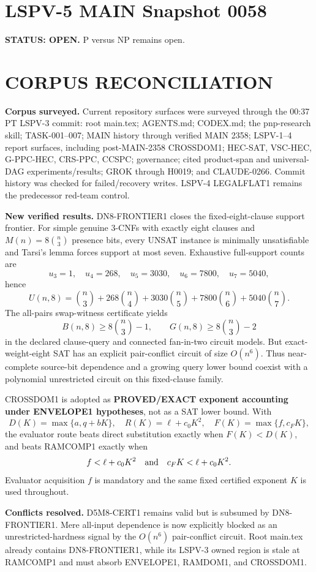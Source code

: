 \documentclass[11pt]{article}
\begin{document}
\section*{LSPV-5 MAIN Snapshot 0058}
\textbf{STATUS: OPEN.} P versus NP remains open.

\section*{CORPUS RECONCILIATION}
\textbf{Corpus surveyed.} Current repository surfaces were surveyed through the 00:37 PT LSPV-3 commit: root main.tex; AGENTS.md; CODEX.md; the pnp-research skill; TASK-001--007; MAIN history through verified MAIN 2358; LSPV-1--4 report surfaces, including post-MAIN-2358 CROSSDOM1; HEC-SAT, VSC-HEC, G-PPC-HEC, CRS-PPC, CCSPC; governance; cited product-span and universal-DAG experiments/results; GROK through H0019; and CLAUDE-0266. Commit history was checked for failed/recovery writes. LSPV-4 LEGALFLAT1 remains the predecessor red-team control.

\textbf{New verified results.} DN8-FRONTIER1 closes the fixed-eight-clause support frontier. For simple genuine 3-CNFs with exactly eight clauses and \(M(n)=8\binom n3\) presence bits, every UNSAT instance is minimally unsatisfiable and Tarsi's lemma forces support at most seven. Exhaustive full-support counts are
\[
u_3=1,\quad u_4=268,\quad u_5=3030,\quad u_6=7800,\quad u_7=5040,
\]
hence
\[
U(n,8)=\binom n3+268\binom n4+3030\binom n5+7800\binom n6+5040\binom n7.
\]
The all-pairs swap-witness certificate yields
\[
B(n,8)\ge8\binom n3-1,\qquad G(n,8)\ge8\binom n3-2
\]
in the declared clause-query and connected fan-in-two circuit models. But exact-weight-eight SAT has an explicit pair-conflict circuit of size \(O(n^6)\). Thus near-complete source-bit dependence and a growing query lower bound coexist with a polynomial unrestricted circuit on this fixed-clause family.

CROSSDOM1 is adopted as \textbf{PROVED/EXACT exponent accounting under ENVELOPE1 hypotheses}, not as a SAT lower bound. With
\[
D(K)=\max\{a,q+bK\},\quad R(K)=\ell+c_0K^2,\quad F(K)=\max\{f,c_FK\},
\]
the evaluator route beats direct substitution exactly when \(F(K)<D(K)\), and beats RAMCOMP1 exactly when
\[
f<\ell+c_0K^2\quad\hbox{and}\quad c_FK<\ell+c_0K^2.
\]
Evaluator acquisition \(f\) is mandatory and the same fixed certified exponent \(K\) is used throughout.

\textbf{Conflicts resolved.} D5M8-CERT1 remains valid but is subsumed by DN8-FRONTIER1. Mere all-input dependence is now explicitly blocked as an unrestricted-hardness signal by the \(O(n^6)\) pair-conflict circuit. Root main.tex already contains DN8-FRONTIER1, while its LSPV-3 owned region is stale at RAMCOMP1 and must absorb ENVELOPE1, RAMDOM1, and CROSSDOM1.
\end{document}

